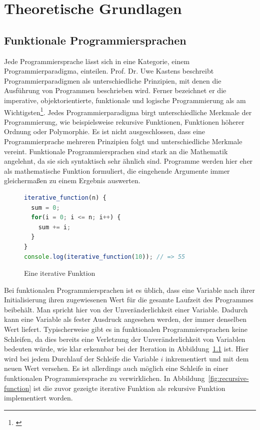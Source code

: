 \chapter{Theoretische Grundlagen}
\label{sec:grundlagen}

\section{Funktionale Programmiersprachen}
\label{sec:funktionaleProgrammiersprache}
Jede Programmiersprache lässt sich in eine Kategorie, einem Programmierparadigma, einteilen.
Prof. Dr. Uwe Kastens beschreibt Programmierparadigmen als \glqq unterschiedliche Prinzipien, mit denen die Ausführung von Programmen beschrieben wird\grqq\cite{definition-programmierparadigmen}.
Ferner bezeichnet er die imperative, objektorientierte, funktionale und logische Programmierung als am Wichtigsten\footnote{\cite[Vgl.]{definition-programmierparadigmen}}. Jedes Programmierparadigma birgt unterschiedliche Merkmale der Programmierung, wie beispielsweise rekursive Funktionen, Funktionen höherer Ordnung oder Polymorphie. Es ist nicht ausgeschlossen, dass eine Programmierprache mehreren Prinzipien folgt und unterschiedliche Merkmale vereint. Funktionale Programmiersprachen sind stark an die Mathematik angelehnt, da sie sich syntaktisch sehr ähnlich sind. Programme werden hier eher als mathematische Funktion formuliert, die eingehende Argumente immer gleichermaßen zu einem Ergebnis auswerten.
\begin{figure}[h]
\begin{lstlisting}[language=JavaScript]
iterative_function(n) {
  sum = 0;
  for(i = 0; i <= n; i++) {
    sum += i;
  }
}
console.log(iterative_function(10)); // => 55
\end{lstlisting}
\caption{Eine iterative Funktion}\label{fig:iterative-function}
\end{figure}
Bei funktionalen Programmiersprachen ist es üblich, dass eine Variable nach ihrer Initialisierung ihren zugewiesenen Wert für die gesamte Laufzeit des Programmes beibehält. Man spricht hier von der Unveränderlichkeit einer Variable. Dadurch kann eine Variable als fester Ausdruck angesehen werden, der immer denselben Wert liefert.
Typischerweise gibt es in funktionalen Programmiersprachen keine Schleifen, da dies bereits eine Verletzung der Unveränderlichkeit von Variablen bedeuten würde, wie klar erkennbar bei der Iteration in Abbildung~\ref{fig:iterative-function} ist.
Hier wird bei jedem Durchlauf der Schleife die Variable $i$ inkrementiert und mit dem neuen Wert versehen. Es ist allerdings auch möglich eine Schleife in einer funktionalen Programmiersprache zu verwirklichen. In Abbildung~\ref{fig:recursive-function} ist die zuvor gezeigte iterative Funktion als rekursive Funktion implementiert worden.
